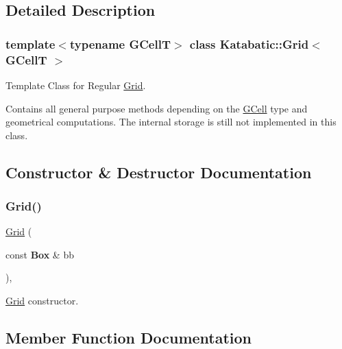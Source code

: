\subsection{Detailed Description}
\subsubsection*{template$<$typename G\+CellT$>$\newline
class Katabatic\+::\+Grid$<$ G\+Cell\+T $>$}

Template Class for Regular \mbox{\hyperlink{classKatabatic_1_1Grid}{Grid}}. 

Contains all general purpose methods depending on the \mbox{\hyperlink{classKatabatic_1_1GCell}{G\+Cell}} type and geometrical computations. The internal storage is still not implemented in this class. 

\subsection{Constructor \& Destructor Documentation}
\mbox{\label{classKatabatic_1_1Grid_a1b772cc784f7110caca47acb76dcec62}} 
\subsubsection{\texorpdfstring{Grid()}{Grid()}}
{\footnotesize\ttfamily \mbox{\hyperlink{classKatabatic_1_1Grid}{Grid}} (\begin{DoxyParamCaption}\item[{const \textbf{ Box} \&}]{bb }\end{DoxyParamCaption})\hspace{0.3cm}{\ttfamily [inline]}, {\ttfamily [protected]}}

\mbox{\hyperlink{classKatabatic_1_1Grid}{Grid}} constructor. 

\subsection{Member Function Documentation}
\mbox{\label{classKatabatic_1_1Grid_a98650c11b4aa0c6107c4d890dff61587}} 
